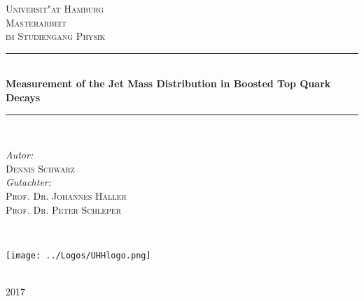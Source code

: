 \begin{titlepage}

\newcommand{\HRule}{\rule{\linewidth}{0.5mm}} %

\center %
 

\textsc{\LARGE Universit"at Hamburg}\\[1.5cm] %
\textsc{\Large Masterarbeit}\\[0.5cm] %
\textsc{\large im Studiengang Physik}\\[0.5cm] %


\HRule \\[0.4cm]
{\bfseries \huge Measurement of the Jet Mass Distribution in Boosted Top Quark Decays \\[0.4cm] } 
\HRule \\[4cm]
 
\begin{minipage}[t l]{0.5\textwidth}
\begin{flushleft} \large
\emph{Autor:}\\
\textsc{Dennis Schwarz} %
\\[1cm]
\emph{Gutachter:} \\
\textsc{Prof. Dr. Johannes Haller} \\ 
\textsc{Prof. Dr. Peter Schleper}
\end{flushleft}
\end{minipage}
~
\begin{minipage}[t r]{0.4\textwidth}
\begin{flushright}
\texttt{[image: ../Logos/UHHlogo.png]}
\end{flushright}
\end{minipage}
\\[4cm]
{\large 2017} %

\vfill %

\end{titlepage}
